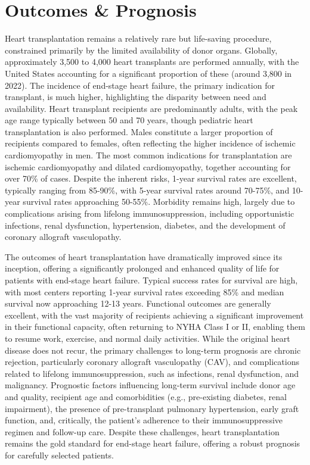 \section*{Outcomes \& Prognosis}
Heart transplantation remains a relatively rare but life-saving procedure, constrained primarily by the limited availability of donor organs. Globally, approximately 3,500 to 4,000 heart transplants are performed annually, with the United States accounting for a significant proportion of these (around 3,800 in 2022). The incidence of end-stage heart failure, the primary indication for transplant, is much higher, highlighting the disparity between need and availability. Heart transplant recipients are predominantly adults, with the peak age range typically between 50 and 70 years, though pediatric heart transplantation is also performed. Males constitute a larger proportion of recipients compared to females, often reflecting the higher incidence of ischemic cardiomyopathy in men. The most common indications for transplantation are ischemic cardiomyopathy and dilated cardiomyopathy, together accounting for over 70\% of cases. Despite the inherent risks, 1-year survival rates are excellent, typically ranging from 85-90\%, with 5-year survival rates around 70-75\%, and 10-year survival rates approaching 50-55\%. Morbidity remains high, largely due to complications arising from lifelong immunosuppression, including opportunistic infections, renal dysfunction, hypertension, diabetes, and the development of coronary allograft vasculopathy.

The outcomes of heart transplantation have dramatically improved since its inception, offering a significantly prolonged and enhanced quality of life for patients with end-stage heart failure. Typical success rates for survival are high, with most centers reporting 1-year survival rates exceeding 85\% and median survival now approaching 12-13 years. Functional outcomes are generally excellent, with the vast majority of recipients achieving a significant improvement in their functional capacity, often returning to NYHA Class I or II, enabling them to resume work, exercise, and normal daily activities. While the original heart disease does not recur, the primary challenges to long-term prognosis are chronic rejection, particularly coronary allograft vasculopathy (CAV), and complications related to lifelong immunosuppression, such as infections, renal dysfunction, and malignancy. Prognostic factors influencing long-term survival include donor age and quality, recipient age and comorbidities (e.g., pre-existing diabetes, renal impairment), the presence of pre-transplant pulmonary hypertension, early graft function, and, critically, the patient's adherence to their immunosuppressive regimen and follow-up care. Despite these challenges, heart transplantation remains the gold standard for end-stage heart failure, offering a robust prognosis for carefully selected patients.

